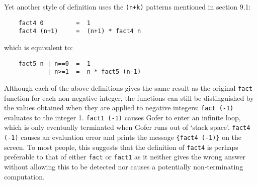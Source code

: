 Yet another style of definition uses the \verb=(n+k)=  patterns  mentioned  in
section 9.1:
\begin{verbatim}
    fact4 0         =  1
    fact4 (n+1)     =  (n+1) * fact4 n
\end{verbatim}
which is equivalent to:
\begin{verbatim}
    fact5 n | n==0  =  1
            | n>=1  =  n * fact5 (n-1)
\end{verbatim}
Although each of the above definitions gives the same  result
as the original \verb"fact" function  for  each  non-negative  integer,  the
functions can still be distinguished by the values obtained  when  they
are applied to negative integers:
\BSI
\IT  \verb"fact (-1)" evaluates to the integer 1.
\IT  \verb"fact1 (-1)" causes Gofer to enter an infinite loop, which is only
     eventually terminated when Gofer runs out of `stack space'.
\IT  \verb"fact4 (-1)" causes an evaluation error and prints the
      message \verb"{fact4 (-1)}" on the screen.
\ESI
To most people, this suggests that the definition of \verb"fact4" is perhaps
preferable to that of either \verb"fact" or \verb"fact1" 
as it neither gives  the
wrong answer  without  allowing  this  to  be  detected  nor  causes  a
potentially non-terminating computation.


